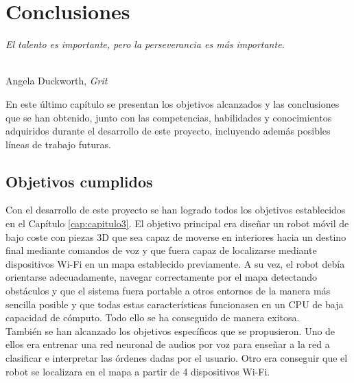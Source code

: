 \chapter{Conclusiones}
\label{cap:capitulo5}

\begin{flushright}
\begin{minipage}[]{10cm}
\emph{El talento es importante, pero la perseverancia es más importante.}\\
\end{minipage}\\

Angela Duckworth, \textit{Grit}\\
\end{flushright}

\vspace{1cm}

En este último capítulo se presentan los objetivos alcanzados y las conclusiones que se han obtenido, junto con las competencias, habilidades y conocimientos adquiridos durante el desarrollo de este proyecto, incluyendo además posibles líneas de trabajo futuras.


\section{Objetivos cumplidos}
\label{sec:objetivos_cumplidos}


Con el desarrollo de este proyecto se han logrado todos los objetivos establecidos en el Capítulo \ref{cap:capitulo3}. El objetivo principal era diseñar un robot móvil de bajo coste con piezas 3D que sea capaz de moverse en interiores hacia un destino final mediante comandos de voz y que fuera capaz de localizarse mediante dispositivos Wi-Fi en un mapa establecido previamente. A su vez, el robot debía orientarse adecuadamente, navegar correctamente por el mapa detectando obstáculos y que el sistema fuera portable a otros entornos de la manera más sencilla posible y que todas estas características funcionasen en un CPU de baja capacidad de cómputo. Todo ello se ha conseguido de manera exitosa.\\


También se han alcanzado los objetivos específicos que se propusieron. Uno de ellos era entrenar una red neuronal de audios por voz para enseñar a la red a clasificar e interpretar las órdenes dadas por el usuario. Otro era conseguir que el robot se localizara en el mapa a partir de 4 dispositivos Wi-Fi.\\

